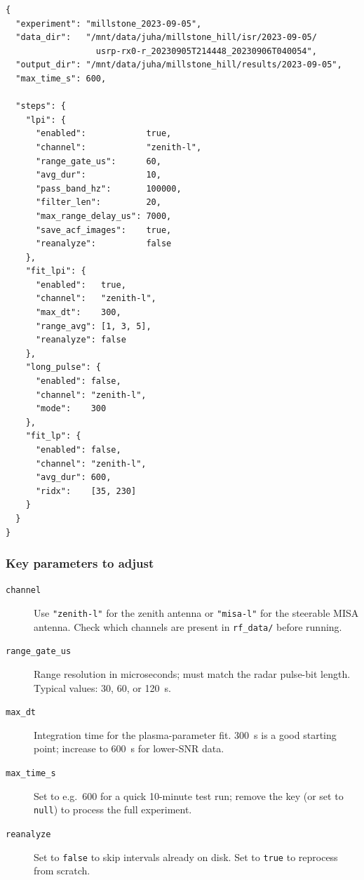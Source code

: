 \begin{verbatim}
{
  "experiment": "millstone_2023-09-05",
  "data_dir":   "/mnt/data/juha/millstone_hill/isr/2023-09-05/
                  usrp-rx0-r_20230905T214448_20230906T040054",
  "output_dir": "/mnt/data/juha/millstone_hill/results/2023-09-05",
  "max_time_s": 600,

  "steps": {
    "lpi": {
      "enabled":            true,
      "channel":            "zenith-l",
      "range_gate_us":      60,
      "avg_dur":            10,
      "pass_band_hz":       100000,
      "filter_len":         20,
      "max_range_delay_us": 7000,
      "save_acf_images":    true,
      "reanalyze":          false
    },
    "fit_lpi": {
      "enabled":   true,
      "channel":   "zenith-l",
      "max_dt":    300,
      "range_avg": [1, 3, 5],
      "reanalyze": false
    },
    "long_pulse": {
      "enabled": false,
      "channel": "zenith-l",
      "mode":    300
    },
    "fit_lp": {
      "enabled": false,
      "channel": "zenith-l",
      "avg_dur": 600,
      "ridx":    [35, 230]
    }
  }
}
\end{verbatim}

\subsubsection*{Key parameters to adjust}

\begin{description}
  \item[\texttt{channel}]
    Use \texttt{"zenith-l"} for the zenith antenna or \texttt{"misa-l"}
    for the steerable MISA antenna.
    Check which channels are present in \texttt{rf\_data/} before running.
  \item[\texttt{range\_gate\_us}]
    Range resolution in microseconds; must match the radar pulse-bit length.
    Typical values: 30, 60, or 120~\textmu s.
  \item[\texttt{max\_dt}]
    Integration time for the plasma-parameter fit.
    300~s is a good starting point; increase to 600~s for lower-SNR data.
  \item[\texttt{max\_time\_s}]
    Set to e.g.\ 600 for a quick 10-minute test run; remove the key
    (or set to \texttt{null}) to process the full experiment.
  \item[\texttt{reanalyze}]
    Set to \texttt{false} to skip intervals already on disk.
    Set to \texttt{true} to reprocess from scratch.
\end{description}


